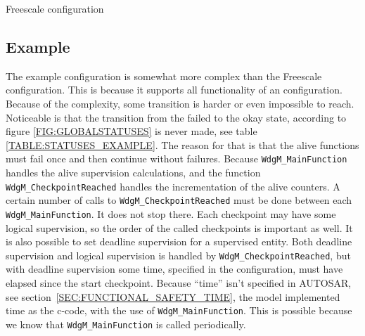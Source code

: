 \begin{table}[!ht]
  \caption{Freescale configuration}
  \label{TABLE:STATUSES_FREESCALE}
  
\end{table}

\subsection{Example}
The example configuration is somewhat more complex than the Freescale
configuration. This is because it supports all functionality of an
configuration. Because of the complexity, some transition is harder or even
impossible to reach. Noticeable is that the transition from the failed to
the okay state, according to figure \ref{FIG:GLOBALSTATUSES} is never made, see
table \ref{TABLE:STATUSES_EXAMPLE}. The reason for that is that the alive
functions must fail once and then continue without failures. Because
\lstinline!WdgM_MainFunction! handles the alive supervision calculations, and
the function \lstinline!WdgM_CheckpointReached! handles the incrementation of
the alive counters. A certain number of calls to
\lstinline!WdgM_CheckpointReached! must be done between each
\lstinline!WdgM_MainFunction!. It does not stop there. Each checkpoint may have
some logical supervision, so the order of the called checkpoints is important as
well. It is also possible to set deadline supervision for a supervised
entity. Both deadline supervision and logical supervision is handled by
\lstinline!WdgM_CheckpointReached!, but with deadline supervision some time,
specified in the configuration, must have elapsed since the start
checkpoint. Because ``time'' isn't specified in AUTOSAR, see
section~\ref{SEC:FUNCTIONAL_SAFETY_TIME}, the model implemented time as the
c-code, with the use of \lstinline!WdgM_MainFunction!. This is possible because
we know that \lstinline!WdgM_MainFunction! is called periodically.

